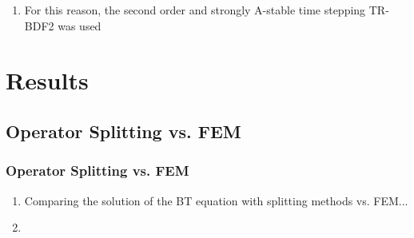 \begin{frame}
\begin{enumerate}
    \item For this reason, the second order and strongly A-stable time stepping \textsc{TR-BDF2} was used
\end{enumerate}
\end{frame}


\section{Results}

\subsection{Operator Splitting vs. FEM}

\begin{frame}
\frametitle{Operator Splitting vs. FEM}
\begin{enumerate}
    \item Comparing the solution of the BT equation with splitting methods vs. FEM...
    \item {} %
\end{enumerate}
\end{frame}


